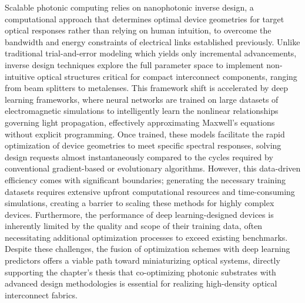 Scalable photonic computing relies on nanophotonic inverse design, a computational approach that determines optimal device geometries for target optical responses rather than relying on human intuition, to overcome the bandwidth and energy constraints of electrical links established previously. \citep{doi_10_1002_lpor_202503115_6bf85dd2} \citep{doi_10_1039_d4nr03081h_5c44e89e} Unlike traditional trial-and-error modeling which yields only incremental advancements, inverse design techniques explore the full parameter space to implement non-intuitive optical structures critical for compact interconnect components, ranging from beam splitters to metalenses. This framework shift is accelerated by deep learning frameworks, where neural networks are trained on large datasets of electromagnetic simulations to intelligently learn the nonlinear relationships governing light propagation, effectively approximating Maxwell's equations without explicit programming. Once trained, these models facilitate the rapid optimization of device geometries to meet specific spectral responses, solving design requests almost instantaneously compared to the cycles required by conventional gradient-based or evolutionary algorithms. However, this data-driven efficiency comes with significant boundaries; generating the necessary training datasets requires extensive upfront computational resources and time-consuming simulations, creating a barrier to scaling these methods for highly complex devices. Furthermore, the performance of deep learning-designed devices is inherently limited by the quality and scope of their training data, often necessitating additional optimization processes to exceed existing benchmarks. Despite these challenges, the fusion of optimization schemes with deep learning predictors offers a viable path toward miniaturizing optical systems, directly supporting the chapter's thesis that co-optimizing photonic substrates with advanced design methodologies is essential for realizing high-density optical interconnect fabrics. \citep{doi_10_1515_nanoph_2021_0660_2d91a441} \citep{doi_10_1515_nanoph_2024_0536_4b6631ba} \citep{doi_10_1515_nanoph_2018_0183_d85e9193} \citep{doi_10_1515_nanoph_2019_0474_d2187501}

